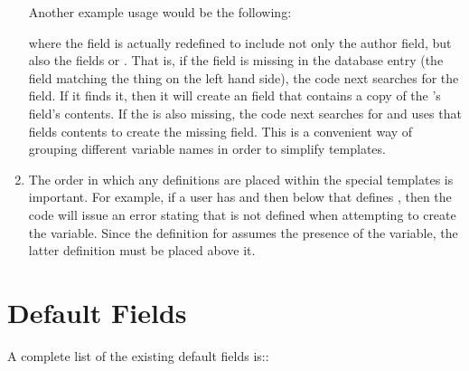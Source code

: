 \documentclass[letterpaper,10pt,english]{sphinxmanual}
\begin{document}
\begin{enumerate}
Another example usage would be the following:

%
\begin{sphinxVerbatim}[commandchars=\\\{\}]
  \PYG{p}{[}\PYG{p}{]}
\end{sphinxVerbatim}

where the  field is actually redefined to include not only the  author field, but also the fields  or . That is, if the  field is missing in the database entry (the field matching the thing on the left hand side), the code next searches for the  field. If it finds it, then it will create an  field that contains a copy of the ’s field’s contents. If the  is also missing, the code next searches for  and uses that fields contents to create the missing  field. This is a convenient way of grouping different variable names in order to simplify templates.

\item {} 
The order in which any definitions are placed within the special templates is important. For example, if a user has  and then below that defines , then the code will issue an error stating that  is not defined when attempting to create the  variable. Since the definition for  assumes the presence of the  variable, the latter definition must be placed above it.

\end{enumerate}


\section{Default Fields}
\label{\detokenize{guidelines_for_writing_style_templates:default-fields}}
A complete list of the existing default fields is::
\end{document}
